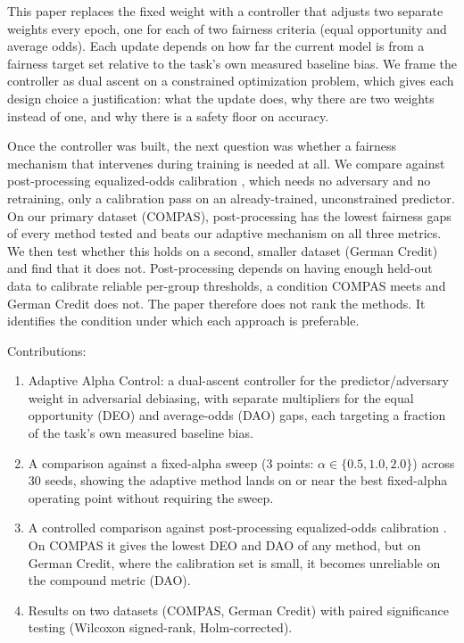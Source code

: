 \documentclass[11pt]{article}
\begin{document}
This paper replaces the fixed weight with a controller that adjusts two
separate weights every epoch, one for each of two fairness criteria
(equal opportunity and average odds). Each update depends on how far the
current model is from a fairness target set relative to the task's own
measured baseline bias. We frame the controller as dual ascent on a
constrained optimization problem, which gives each design choice a
justification: what the update does, why there are two weights instead
of one, and why there is a safety floor on accuracy.

Once the controller was built, the next question was whether a fairness
mechanism that intervenes during training is needed at all. We compare
against post-processing equalized-odds calibration
\citep{hardt2016equality}, which needs no adversary and no retraining,
only a calibration pass on an already-trained, unconstrained predictor.
On our primary dataset (COMPAS), post-processing has the lowest fairness
gaps of every method tested and beats our adaptive mechanism on all
three metrics. We then test whether this holds on a second, smaller
dataset (German Credit) and find that it does not. Post-processing
depends on having enough held-out data to calibrate reliable per-group
thresholds, a condition COMPAS meets and German Credit does not. The
paper therefore does not rank the methods. It identifies the condition
under which each approach is preferable.

Contributions:
\begin{enumerate}
  \item Adaptive Alpha Control: a dual-ascent controller for the
    predictor/adversary weight in adversarial debiasing, with separate
    multipliers for the equal opportunity (DEO) and average-odds (DAO)
    gaps, each targeting a fraction of the task's own measured baseline
    bias.
  \item A comparison against a fixed-alpha sweep
    (3 points: $\alpha \in \{0.5, 1.0, 2.0\}$) across 30 seeds, showing the
    adaptive method lands on or near the best fixed-alpha operating point
    without requiring the sweep.
  \item A controlled comparison against post-processing equalized-odds
    calibration \citep{hardt2016equality}. On COMPAS it gives the lowest
    DEO and DAO of any method, but on German Credit, where the
    calibration set is small, it becomes unreliable on the compound
    metric (DAO).
  \item Results on two datasets (COMPAS, German Credit) with paired
    significance testing (Wilcoxon signed-rank, Holm-corrected).
\end{enumerate}
\end{document}
